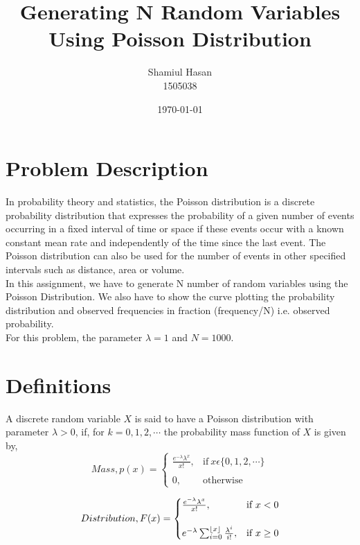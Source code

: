 \documentclass[12pt]{article}
\DeclarePairedDelimiter\floor{\lfloor}{\rfloor}
\begin{document}
\title{Generating N Random Variables Using Poisson Distribution}
\author{Shamiul Hasan\\1505038}
\date{\today}
\maketitle


\section{Problem Description}
In probability theory and statistics, the Poisson distribution is a discrete probability distribution that expresses the probability of a given number of events occurring in a fixed interval of time or space if these events occur with a known constant mean rate and independently of the time since the last event. The Poisson distribution can also be used for the number of events in other specified intervals such as distance, area or volume.\\
In this assignment, we have to generate N number of random variables using the Poisson Distribution. We also have to show the curve plotting the probability distribution and observed frequencies in fraction (frequency/N) i.e. observed probability. \\
For this problem, the parameter $\lambda = 1$ and $N = 1000$.


\section{Definitions}

A discrete random variable $X$ is said to have a Poisson distribution with parameter $\lambda > 0$, if, for $k = 0, 1, 2, \cdots$ the probability mass function of $X$ is given by, \\

\begin{equation}
	Mass, p(x)=
	\begin{cases}
		{\frac {e^{-\lambda}\lambda ^{x}}{x!}}, & \text{if}\ x \epsilon \{0,1,2,\cdots\} \\ \\
		0,                                      & \text{otherwise}
	\end{cases}
\end{equation}


\begin{equation}
	Distribution,F(x)=
	\begin{cases}
		{\frac {e^{-\lambda}\lambda ^{x}}{x!}}, & \text{if}\ x < 0 \\ \\
		e^{-\lambda}\sum_{i=0}^{\floor*{x}}\frac{\lambda^{i}}{i!},   & \text{if}\ x \geq 0
	\end{cases}
\end{equation}
\end{document}

